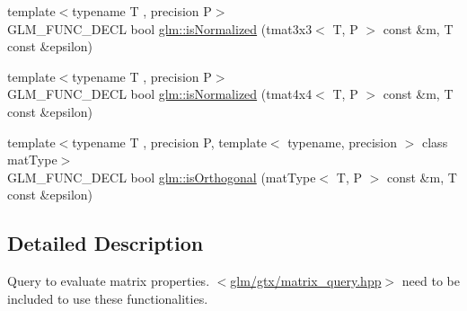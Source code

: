 \begin{DoxyCompactItemize}
{\footnotesize template$<$typename T , precision P$>$ }\\G\-L\-M\-\_\-\-F\-U\-N\-C\-\_\-\-D\-E\-C\-L bool \hyperlink{group__gtx__matrix__query_ga351bcc8d485d329b78cfa875e084964d}{glm\-::is\-Normalized} (tmat3x3$<$ T, P $>$ const \&m, T const \&epsilon)
\item 
{\footnotesize template$<$typename T , precision P$>$ }\\G\-L\-M\-\_\-\-F\-U\-N\-C\-\_\-\-D\-E\-C\-L bool \hyperlink{group__gtx__matrix__query_ga934b673ec0e16d79eca0ca9dbb5d6d8b}{glm\-::is\-Normalized} (tmat4x4$<$ T, P $>$ const \&m, T const \&epsilon)
\item 
{\footnotesize template$<$typename T , precision P, template$<$ typename, precision $>$ class mat\-Type$>$ }\\G\-L\-M\-\_\-\-F\-U\-N\-C\-\_\-\-D\-E\-C\-L bool \hyperlink{group__gtx__matrix__query_gab2cb5d23df77b4e4e63ad2965acd31b3}{glm\-::is\-Orthogonal} (mat\-Type$<$ T, P $>$ const \&m, T const \&epsilon)
\end{DoxyCompactItemize}


\subsection{Detailed Description}
Query to evaluate matrix properties. $<$\hyperlink{matrix__query_8hpp}{glm/gtx/matrix\-\_\-query.\-hpp}$>$ need to be included to use these functionalities. 


